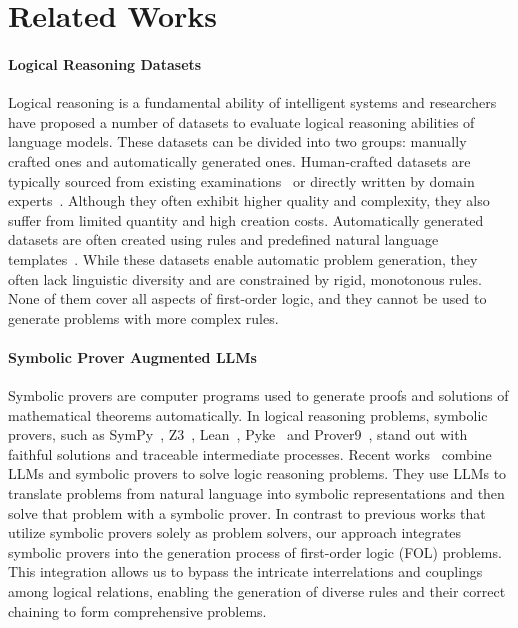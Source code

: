 \section{Related Works}
\label{sec:rela_work}

\paragraph{Logical Reasoning Datasets}
Logical reasoning is a fundamental ability of intelligent systems and researchers have proposed a number of datasets to evaluate logical reasoning abilities of language models. 
These datasets can be divided into two groups: manually crafted ones and automatically generated ones. 
Human-crafted datasets are typically sourced from existing examinations~\citep{reclor, logiqa, logiqa2, arlsat} or directly written by domain experts~\citep{falseqa, folio}. 
Although they often exhibit higher quality and complexity, they also suffer from limited quantity and high creation costs.
Automatically generated datasets are often created using rules and predefined natural language templates~\citep{clutrr, ltl, ruletaker, tafjord2021proofwriter, logicnli, prontoqa1, prontoqaood, conditionalqa}. 
While these datasets enable automatic problem generation, they often lack linguistic diversity and are constrained by rigid, monotonous rules. 
None of them cover all aspects of first-order logic, and they cannot be used to generate problems with more complex rules.


\paragraph{Symbolic Prover Augmented LLMs}
Symbolic provers are computer programs used to generate proofs and solutions of mathematical theorems automatically. 
In logical reasoning problems, symbolic provers, such as SymPy~\citep{sympy}, Z3~\citep{z3}, Lean~\citep{lean}, Pyke~\citep{pyke} and Prover9~\citep{prover9}, stand out with faithful solutions and traceable intermediate processes. 
Recent works~\citep{logicllm, linc, satlm, zhang2024sola} combine LLMs and symbolic provers to solve logic reasoning problems. 
They use LLMs to translate problems from natural language into symbolic representations and then solve that problem with a symbolic prover. 
In contrast to previous works that utilize symbolic provers solely as problem solvers, our approach integrates symbolic provers into the generation process of first-order logic (FOL) problems. 
This integration allows us to bypass the intricate interrelations and couplings among logical relations, enabling the generation of diverse rules and their correct chaining to form comprehensive problems.